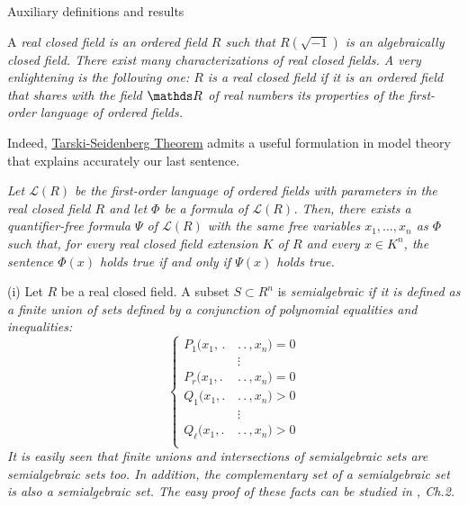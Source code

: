 \documentclass[11pt, a4paper, english, twoside, notitlepage, openright]{report}
\begin{document}
\appendix
\begin{chapter}{Auxiliary definitions and results}

\begin{definition}\label{realCField}
	A \em real closed field \em is an ordered field $R$ such that $R(\sqrt{-1})$ is an algebraically closed field. There exist many characterizations of real closed fields. A very enlightening is the following one: $R$ is a real closed field if it is an ordered field that shares with the field $\R$ of real numbers its properties of the first-order language of ordered fields. 
\end{definition}

Indeed, \hyperref[tarskiSeidenberg]{Tarski-Seidenberg Theorem} admits a useful formulation in model theory that explains accurately our last sentence.

\begin{theorem}\label{TP} \em Let ${\mathcal L}(R)$ be the first-order language of ordered fields with parameters in the real closed field $R$ and let $\Phi$ be a formula of ${\mathcal L}(R)$. Then, there exists a quantifier-free formula $\Psi$ of ${\mathcal L}(R)$ with the same free variables $x_1,\dots,x_n$ as $\Phi$ such that, for every real closed field extension $K$ of $R$ and every $x\in K^n$, the sentence $\Phi(x)$ holds true if and only if $\Psi(x)$ holds true.\em

\end{theorem}


\begin{definitions}\label{semialgSet} (i) Let $R$ be a real closed field. A subset $S\subset R^n$ is \em semialgebraic \em if it is defined as a finite union of sets defined by a conjunction of polynomial equalities and inequalities: 
	\begin{equation*}
	\left\{
	\begin{aligned}
		P_1(x_1,\, .\,&.\,.\, , x_n) = 0\\
		&\vdots\\
		P_r(x_1, .\,&.\,.\, , x_n) = 0 \\
		Q_1(x_1, .\,&.\,.\, , x_n) > 0 \\
		&\vdots\\
		Q_{\ell}(x_1, .\,&.\,.\, , x_n) > 0 \\
	\end{aligned}
	\right.
	\end{equation*}
It is easily seen that finite unions and intersections of semialgebraic sets are semialgebraic sets too. In addition, the complementary set of a semialgebraic set is also a semialgebraic set. The easy proof of these facts can be studied in \cite{bcr}, Ch.2.
	

\end{definitions}
\end{chapter}
\end{document}
